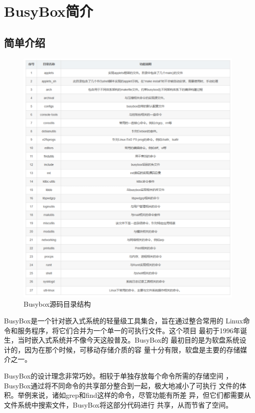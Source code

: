 \section{BusyBox简介}
\subsection{简单介绍}

\begin{figure}[htb]
	\centering
	\includegraphics[width=\textwidth]{figures/09-02-Busybox源码目录结构.png}
	\caption{
		Busybox源码目录结构
	}
	\label{fig:user virtual process}
\end{figure}

BusyBox是一个针对嵌入式系统的轻量级工具集合，旨在通过整合常用的
Linux命令和服务程序，将它们合并为一个单一的可执行文件。这个项目
最初于1996年诞生，当时嵌入式系统并不像今天这般普及。BusyBox的
最初目的是为软盘系统设计的，因为在那个时候，可移动存储介质的容
量十分有限，软盘是主要的存储媒介之一。

BusyBox的设计理念非常巧妙。相较于单独存放每个命令所需的存储空间
，BusyBox通过将不同命令的共享部分整合到一起，极大地减小了可执行
文件的体积。举例来说，诸如grep和find这样的命令，尽管功能有所差
异，但它们都需要从文件系统中搜索文件，BusyBox将这部分代码进行
共享，从而节省了空间。

